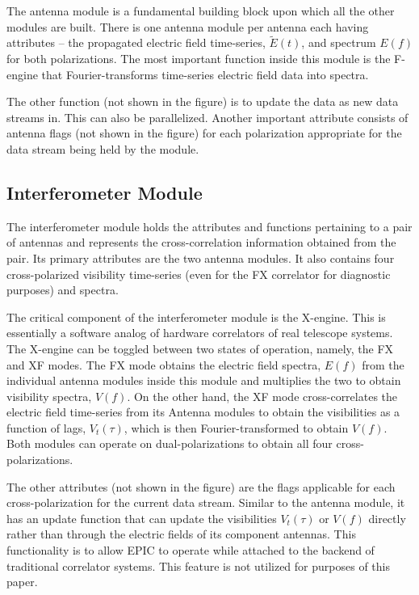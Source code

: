 \documentclass[a4paper,fleqn,usenatbib]{mnras}
\begin{document}
The antenna module is a fundamental building block upon which all the other modules are built. There is one antenna module per antenna each having attributes -- the propagated electric field time-series, $\widetilde{E}(t)$, and spectrum $E(f)$ for both polarizations. The most important function inside this module is the F-engine that Fourier-transforms time-series electric field data into spectra. 

The other function (not shown in the figure) is to update the data as new data streams in. This can also be parallelized. Another important attribute consists of antenna flags (not shown in the figure) for each polarization appropriate for the data stream being held by the module. 

\subsection{Interferometer Module}

The interferometer module holds the attributes and functions pertaining to a pair of antennas and represents the cross-correlation information obtained from the pair. Its primary attributes are the two antenna modules. It also contains four cross-polarized visibility time-series (even for the FX correlator for diagnostic purposes) and spectra. 

The critical component of the interferometer module is the X-engine. This is essentially a software analog of hardware correlators of real telescope systems. The X-engine can be toggled between two states of operation, namely, the FX and XF modes. The FX mode obtains the electric field spectra, $E(f)$ from the individual antenna modules inside this module and multiplies the two to obtain visibility spectra, $V(f)$. On the other hand, the XF mode cross-correlates the electric field time-series from its Antenna modules to obtain the visibilities as a function of lags, $V_t(\tau)$, which is then Fourier-transformed to obtain $V(f)$. Both modules can operate on dual-polarizations to obtain all four cross-polarizations.

The other attributes (not shown in the figure) are the flags applicable for each cross-polarization for the current data stream. Similar to the antenna module, it has an update function that can update the visibilities $V_t(\tau)$ or $V(f)$ directly rather than through the electric fields of its component antennas. This functionality is to allow EPIC to operate while attached to the backend of traditional correlator systems. This feature is not utilized for purposes of this paper.
\end{document}
